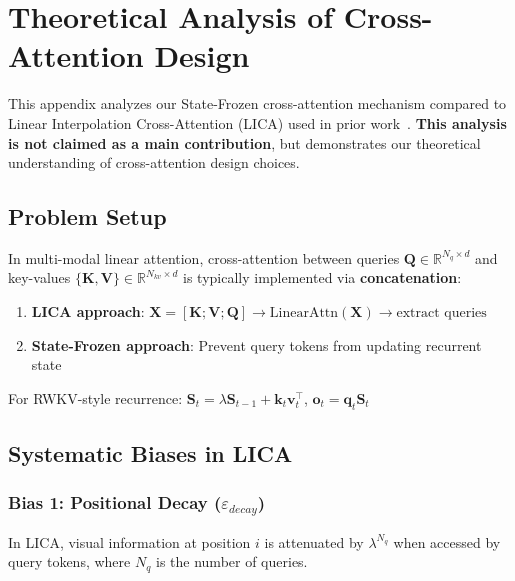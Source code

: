
\section{Theoretical Analysis of Cross-Attention Design}
\label{appendix:cross_attention}

This appendix analyzes our State-Frozen cross-attention mechanism compared to Linear Interpolation Cross-Attention (LICA) used in prior work~\cite{lady}. \textbf{This analysis is not claimed as a main contribution}, but demonstrates our theoretical understanding of cross-attention design choices.

\subsection{Problem Setup}

In multi-modal linear attention, cross-attention between queries $\mathbf{Q} \in \mathbb{R}^{N_q \times d}$ and key-values $\{\mathbf{K}, \mathbf{V}\} \in \mathbb{R}^{N_{kv} \times d}$ is typically implemented via \textbf{concatenation}:

\begin{enumerate}
    \item \textbf{LICA approach}: $\mathbf{X} = [\mathbf{K}; \mathbf{V}; \mathbf{Q}] \rightarrow \text{LinearAttn}(\mathbf{X}) \rightarrow \text{extract queries}$
    \item \textbf{State-Frozen approach}: Prevent query tokens from updating recurrent state
\end{enumerate}

For RWKV-style recurrence: $\mathbf{S}_t = \lambda \mathbf{S}_{t-1} + \mathbf{k}_t \mathbf{v}_t^\top$, $\mathbf{o}_t = \mathbf{q}_t \mathbf{S}_t$

\subsection{Systematic Biases in LICA}

\subsubsection{Bias 1: Positional Decay ($\varepsilon_{decay}$)}

\begin{theorem}
In LICA, visual information at position $i$ is attenuated by $\lambda^{N_q}$ when accessed by query tokens, where $N_q$ is the number of queries.
\end{theorem}

